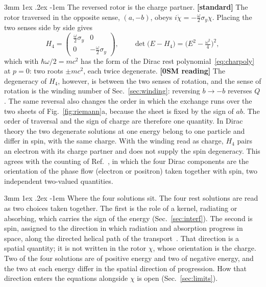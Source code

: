 \documentclass[%
 reprint, amsmath,amssymb, aps, prb, ]{revtex4-2}
\makeatletter
\numberwithin{equation}{section}
\renewcommand\paragraph{%
  \@startsection{paragraph}{4}{\z@}%
    {3mm \@plus 1ex \@minus .2ex}%
    {-1em}%
    {\normalfont\normalsize\itshape}}
\makeatother
\begin{document}
\paragraph{The reversed rotor is the charge partner.} \textbf{[standard]} The rotor traversed in the opposite sense, $(a,-b)$, obeys $i\dot\chi=-\tfrac{\omega}{2}\sigma_y\chi$. Placing the two senses side by side gives
\begin{equation}
H_4=\begin{pmatrix}\tfrac{\omega}{2}\sigma_y&0\\0&-\tfrac{\omega}{2}\sigma_y\end{pmatrix},\qquad
\det\!\big(E-H_4\big)=\Big(E^2-\tfrac{\omega^2}{4}\Big)^2 ,
\label{eq:H4}
\end{equation}
which with $\hbar\omega/2=mc^2$ has the form of the Dirac rest polynomial~\eqref{eq:charpoly} at $p=0$: two roots $\pm mc^2$, each twice degenerate. \textbf{[0SM reading]} The degeneracy of $H_4$, however, is between the two senses of rotation, and the sense of rotation is the winding number of Sec.~\ref{sec:winding}: reversing $b\to-b$ reverses $Q$. The same reversal also changes the order in which the exchange runs over the two sheets of Fig.~\ref{fig:riemann}a, because the sheet is fixed by the sign of $ab$. The order of traversal and the sign of charge are therefore one quantity. In Dirac theory the two degenerate solutions at one energy belong to one particle and differ in spin, with the same charge. With the winding read as charge, $H_4$ pairs an electron with its charge partner and does not supply the spin degeneracy. This agrees with the counting of Ref.~\cite{ref:p50}, in which the four Dirac components are the orientation of the phase flow (electron or positron) taken together with spin, two independent two-valued quantities.

\paragraph{Where the four solutions sit.} The four rest solutions are read as two choices taken together. The first is the role of a kernel, radiating or absorbing, which carries the sign of the energy (Sec.~\ref{sec:interf}). The second is spin, assigned to the direction in which radiation and absorption progress in space, along the directed helical path of the transport~\cite{ref:p51}. That direction is a spatial quantity; it is not written in the rotor $\chi$, whose orientation is the charge. Two of the four solutions are of positive energy and two of negative energy, and the two at each energy differ in the spatial direction of progression. How that direction enters the equations alongside $\chi$ is open (Sec.~\ref{sec:limits}).
\end{document}
